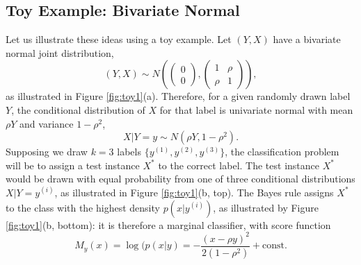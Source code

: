 \documentclass[twoside,11pt]{article}
\begin{document}
\subsection{Toy Example: Bivariate Normal}
\label{sec:toyExA}

Let us illustrate these ideas using a toy example.  Let $(Y, X)$ have
a bivariate normal joint distribution,
\[
(Y, X) \sim N\left(\begin{pmatrix}0 \\0\end{pmatrix}, \begin{pmatrix}1 & \rho \\ \rho & 1\end{pmatrix}\right),
\]
as illustrated in Figure \ref{fig:toy1}(a).  Therefore, for a given
randomly drawn label $Y$, the conditional
distribution of $X$ for that label is univariate normal with mean $\rho Y$ and variance $1-\rho^2$,
\[
X|Y = y \sim N(\rho Y, 1-\rho^2).
\]
Supposing we draw $k = 3$ labels $\{y^{(1)},y^{(2)}, y^{(3)}\}$, the classification
problem will be to assign a test instance $X^*$ to the correct label.
The test instance $X^*$ would be drawn with equal probability from one
of three conditional distributions $ X | Y=y^{(i)}$, as illustrated in
Figure \ref{fig:toy1}(b, top).  The Bayes rule assigns $X^*$ to the
class with the highest density $p(x|y^{(i)})$, as illustrated by Figure
\ref{fig:toy1}(b, bottom): it is therefore a marginal classifier, with
score function
\[
M_y(x) = \log(p(x|y) = -\frac{(x - \rho y)^2}{2(1-\rho^2)}  + \text{const.}
\] %

\end{document}
